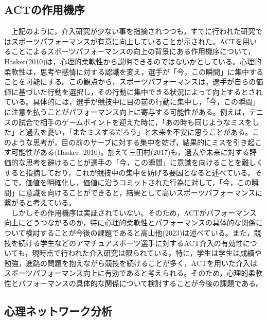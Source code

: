 \documentclass[12pt,a4paper,xelatex,ja=standard]{bxjsarticle}
\begin{document}
\hypertarget{actux306eux4f5cux7528ux6a5fux5e8f}{%
\subsection{ACTの作用機序}\label{actux306eux4f5cux7528ux6a5fux5e8f}}

　上記のように，介入研究が少ない事を指摘されつつも，すでに行われた研究ではスポーツパフォーマンスが有意に向上していることが示された。ACTを用いることによるスポーツパフォーマンスの向上の背景にある作用機序について，Hasker(2010)は，心理的柔軟性から説明できるのではないかとしている。心理的柔軟性は，思考や感情に対する認識を変え，選手が「今，この瞬間」に集中することを可能にする。この観点から，スポーツパフォーマンスは，選手が自らの価値に基づいた行動を選択し，その行動に集中できる状況によって向上するとされている。具体的には，選手が競技中に目の前の行動に集中し，「今，この瞬間」に注意を払うことがパフォーマンス向上に寄与する可能性がある。例えば，テニスの試合で相手のゲームポイントを迎えた時に，「あの時も同じようなミスをした」と過去を憂い，「またミスするだろう」と未来を不安に思うことがある。このような思考が，目の前のサーブに対する集中を妨げ，結果的にミスを引き起こす可能性がある(Hasker,
2010)。加えて三田村(2017)も，過去や未来に対する評価的な思考を避けることが選手の「今，この瞬間」に意識を向けることを難しくすると指摘しており，これが競技中の集中を妨げる要因となると述べている。そこで，価値を明確化し，価値に沿うコミットされた行為に対して，「今，この瞬間」に意識を向けることができると，結果として高いスポーツパフォーマンスに繋がると考えている。\\
　しかしその作用機序は実証されていない。そのため，ACTがパフォーマンス向上にどうつながるのか，特に心理的柔軟性とパフォーマンスの具体的な関係について検討することが今後の課題であると高山他(2023)は述べている。また，競技を続ける学生などのアマチュアスポーツ選手に対するACT介入の有効性についても，現時点で行われた介入研究は限られている。特に，学生は学生は成績や勉強，進路の問題を抱えながら競技を続けることが多く，ACTを用いた介入はスポーツパフォーマンス向上に有効であると考えられる。そのため，心理的柔軟性とパフォーマンスの具体的な関係について検討することが今後の課題である。

\hypertarget{ux5fc3ux7406ux30cdux30c3ux30c8ux30efux30fcux30afux5206ux6790}{%
\subsection{心理ネットワーク分析}\label{ux5fc3ux7406ux30cdux30c3ux30c8ux30efux30fcux30afux5206ux6790}}
\end{document}
